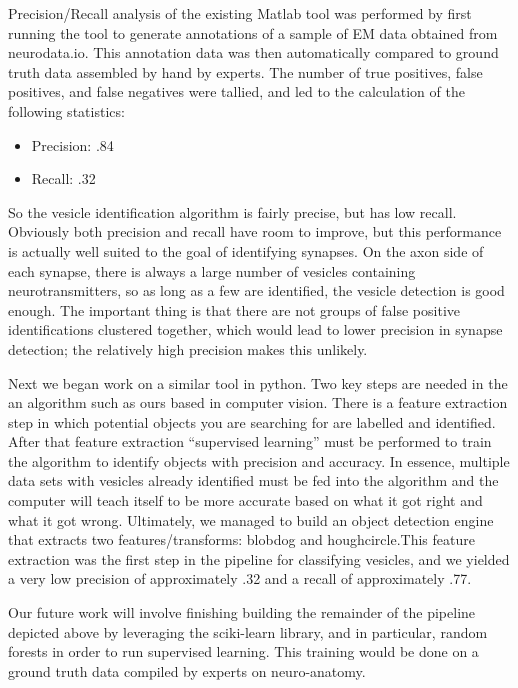 \documentclass[11pt]{article} %
\begin{document}
Precision/Recall analysis of the existing Matlab tool was performed by first running the tool to generate annotations of a sample of EM data obtained from neurodata.io. This annotation data was then automatically compared to ground truth data assembled by hand by experts. The number of true positives, false positives, and false negatives were tallied, and led to the calculation of the following statistics:
\begin{itemize}
\item Precision: .84
\item Recall: .32
\end{itemize}
So the vesicle identification algorithm is fairly precise, but has low recall. Obviously both precision and recall have room to improve, but this performance is actually well suited to the goal of identifying synapses. On the axon side of each synapse, there is always a large number of vesicles containing neurotransmitters, so as long as a few are identified, the vesicle detection is good enough. The important thing is that there are not groups of false positive identifications clustered together, which would lead to lower precision in synapse detection; the relatively high precision makes this unlikely.

Next we began work on a similar tool in python. Two key steps are needed in the an algorithm such as ours based in computer vision. There is a feature extraction step in which potential objects you are searching for are labelled and identified. After that feature extraction “supervised learning” must be performed to train the algorithm to identify objects with precision and accuracy. In essence, multiple data sets with vesicles already identified must be fed into the algorithm and the computer will teach itself to be more accurate based on what it got right and what it got wrong.
Ultimately, we managed to build an object detection engine that extracts two features/transforms: blobdog and houghcircle.This feature extraction was the first step in the pipeline for classifying vesicles, and we yielded a very low precision of approximately .32 and a recall of approximately .77.

Our future work will involve finishing building the remainder of the pipeline depicted above by leveraging the sciki-learn library, and in particular, random forests in order to run supervised learning. This training would be done on a ground truth data compiled by experts on neuro-anatomy.
\end{document}
